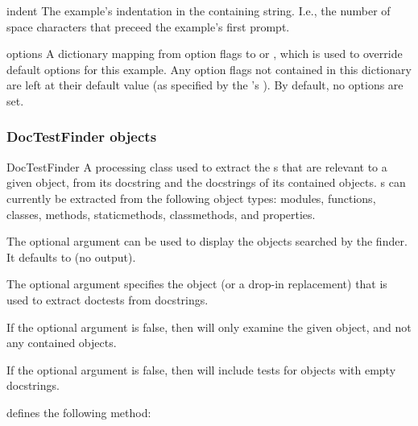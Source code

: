 \begin{memberdesc}{indent}
    The example's indentation in the containing string.  I.e., the
    number of space characters that preceed the example's first
    prompt.
\end{memberdesc}

\begin{memberdesc}{options}
    A dictionary mapping from option flags to  or
    , which is used to override default options for this
    example.  Any option flags not contained in this dictionary are
    left at their default value (as specified by the
    's
).  By default, no options are set.
\end{memberdesc}

\subsubsection{DocTestFinder objects\label{doctest-DocTestFinder}}
\begin{classdesc}{DocTestFinder}{}
    A processing class used to extract the s that are
    relevant to a given object, from its docstring and the docstrings
    of its contained objects.  s can currently be
    extracted from the following object types: modules, functions,
    classes, methods, staticmethods, classmethods, and properties.

    The optional argument  can be used to display the
    objects searched by the finder.  It defaults to  (no
    output).

    The optional argument  specifies the
     object (or a drop-in replacement) that is
    used to extract doctests from docstrings.

    If the optional argument  is false, then
     will only examine the given object,
    and not any contained objects.

    If the optional argument  is false, then
     will include tests for objects with
    empty docstrings.

\end{classdesc}

 defines the following method:


